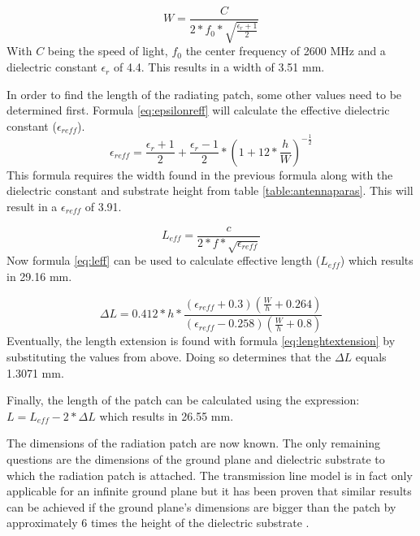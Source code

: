 \begin{equation} 
W = \frac{C}{2*f_0*\sqrt{\frac{\epsilon_r+1}{2}}}
\label{eq:antennawidth}
\end{equation}
With $C$ being the speed of light, $f_0$ the center frequency of 2600 MHz and a dielectric constant $\epsilon_r$ of 4.4. This results 
in a width of 3.51 mm.

In order to find the length of the radiating patch, some other values need to be determined first. Formula \ref{eq:epsilonreff} will
calculate the effective dielectric constant ($\epsilon_{reff}$).
\begin{equation} 
\epsilon_{reff} = \frac{\epsilon_r+1}{2}+  \frac{\epsilon_r-1}{2} * \left(1+12*\frac{h}{W}\right)^{-\frac{1}{2}}
\label{eq:epsilonreff}
\end{equation}
This formula requires the width found in the previous formula along with the dielectric constant and substrate height from table \ref{table:antennaparas}.
This will result in a $\epsilon_{reff}$ of 3.91.

\begin{equation} 
L_{eff} = \frac{c}{2*f*\sqrt{\epsilon_{reff}}}
\label{eq:leff}
\end{equation}
Now formula \ref{eq:leff} can be used to calculate effective length ($L_{eff}$) which results in 29.16 mm.

\begin{equation} 
\Delta L = 0.412*h*\frac{(\epsilon_{reff}+0.3)\left(\frac{W}{h}+0.264\right)}{\left(\epsilon_{reff}-0.258\right)\left(\frac{W}{h}+0.8\right)}
\label{eq:lenghtextension}
\end{equation}
Eventually, the length extension is found with formula \ref{eq:lenghtextension} by substituting the values from above.
Doing so determines that the $\Delta L$ equals 1.3071 mm.

Finally, the length of the patch can be calculated using the expression: $L = L_{eff} - 2 * \Delta L$
which results in 26.55 mm.

The dimensions of the radiation patch are now known. The only remaining questions are the dimensions of the ground plane and dielectric substrate to which the 
radiation patch is attached. The transmission line model is in fact only applicable for an infinite ground plane but it has been proven that similar results
can be achieved if the ground plane's dimensions are bigger than the patch by approximately 6 times the height of the dielectric substrate \cite{J14_antennadesign,J15_antennadesign}.

